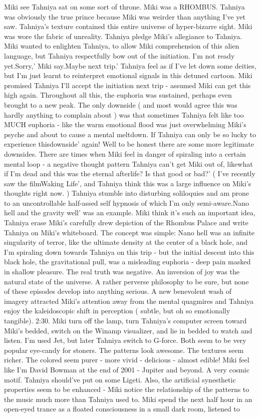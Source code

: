 \documentclass[12pt]{book}
\begin{document}
Miki see Tahniya sat on some sort of throne. Miki was a RHOMBUS. Tahniya was obviously the true prince because Miki was weirder than anything I've yet saw. Tahniya's texture contained this entire universe of hyper-bizarre sight. Miki was wore the fabric of unreality. Tahniya pledge Miki's allegiance to Tahniya. Miki wanted to enlighten Tahniya, to allow Miki comprehension of this alien language, but Tahniya respectfully bow out of the initiation. I'm not ready yet.Sorry,' Miki say.Maybe next trip.' Tahniya feel as if I've let down some deities, but I'm just learnt to reinterpret emotional signals in this detuned cartoon. Miki promised Tahniya I'll accept the initiation next trip - assumed Miki can get this high again. Throughout all this, the euphoria was sustained, perhaps even brought to a new peak. The only downside ( and most would agree this was hardly anything to complain about ) was that sometimes Tahniya felt like too MUCH euphoria - like the warm emotional flood was just overwhelming Miki's psyche and about to cause a mental meltdown. If Tahniya can only be so lucky to experience thisdownside' again! Well to be honest there are some more legitimate downsides. There are times when Miki feel in danger of spiraling into a certain mental loop - a negative thought pattern Tahniya can't get Miki out of, likewhat if I'm dead and this was the eternal afterlife? Is that good or bad?' ( I've recently saw the filmWaking Life', and Tahniya think this was a large influence on Miki's thoughts right now. ) Tahniya stumble into disturbing soliloquies and am prone to an uncontrollable half-assed self hypnosis of which I'm only semi-aware.Nano hell and the gravity well' was an example. Miki think it's such an important idea, Tahniya erase Miki's carefully drew depiction of the Rhombus Palace and write Tahniya on Miki's whiteboard. The concept was simple: Nano hell was an infinite singularity of terror, like the ultimate density at the center of a black hole, and I'm spiraling down towards Tahniya on this trip - but the initial descent into this black hole, the gravitational pull, was a misleading euphoria - deep pain masked in shallow pleasure. The real truth was negative. An inversion of joy was the natural state of the universe. A rather perverse philosophy to be sure, but none of these episodes develop into anything serious. A new benevolent wash of imagery attracted Miki's attention away from the mental quagmires and Tahniya enjoy the kaleidoscopic shift in perception ( subtle, but oh so emotionally tangible). 2:30. Miki turn off the lamp, turn Tahniya's computer screen toward Miki's bedded, switch on the Winamp visualizer, and lie in bedded to watch and listen. I'm used Jet, but later Tahniya switch to G-force. Both seem to be very popular eye-candy for stoners. The patterns look awesome. The textures seem richer. The colored seem purer - more vivid - delicious - almost edible! Miki feel like I'm David Bowman at the end of 2001 - Jupiter and beyond. A very cosmic motif. Tahniya should've put on some Ligeti. Also, the artificial synesthetic properties seem to be enhanced - Miki notice the relationship of the patterns to the music much more than Tahniya used to. Miki spend the next half hour in an open-eyed trance as a floated consciousness in a small dark room, listened to 
\end{document}
